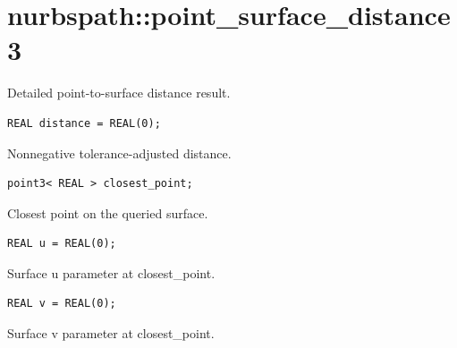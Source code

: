 \section{nurbspath::point\_surface\_distance3}
Detailed point-to-surface distance result.
\par\noindent\begin{minipage}{\linewidth}
\begin{lstlisting}[style=apireference]
REAL distance = REAL(0);
\end{lstlisting}
{\footnotesize Nonnegative tolerance-adjusted distance.\par}
\end{minipage}\par\vspace{1pt}
\par\noindent\begin{minipage}{\linewidth}
\begin{lstlisting}[style=apireference]
point3< REAL > closest_point;
\end{lstlisting}
{\footnotesize Closest point on the queried surface.\par}
\end{minipage}\par\vspace{1pt}
\par\noindent\begin{minipage}{\linewidth}
\begin{lstlisting}[style=apireference]
REAL u = REAL(0);
\end{lstlisting}
{\footnotesize Surface u parameter at closest\_point.\par}
\end{minipage}\par\vspace{1pt}
\par\noindent\begin{minipage}{\linewidth}
\begin{lstlisting}[style=apireference]
REAL v = REAL(0);
\end{lstlisting}
{\footnotesize Surface v parameter at closest\_point.\par}
\end{minipage}\par\vspace{1pt}

